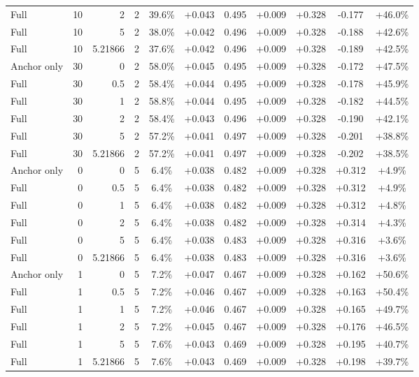 \begin{table}[htbp]
\begin{tabular}{lrrrccccccc}
Full & 10 & 2 & 2 & 39.6\% & +0.043 & 0.495 & +0.009 & +0.328 & -0.177 & +46.0\% \\
Full & 10 & 5 & 2 & 38.0\% & +0.042 & 0.496 & +0.009 & +0.328 & -0.188 & +42.6\% \\
Full & 10 & 5.21866 & 2 & 37.6\% & +0.042 & 0.496 & +0.009 & +0.328 & -0.189 & +42.5\% \\
Anchor only & 30 & 0 & 2 & 58.0\% & +0.045 & 0.495 & +0.009 & +0.328 & -0.172 & +47.5\% \\
Full & 30 & 0.5 & 2 & 58.4\% & +0.044 & 0.495 & +0.009 & +0.328 & -0.178 & +45.9\% \\
Full & 30 & 1 & 2 & 58.8\% & +0.044 & 0.495 & +0.009 & +0.328 & -0.182 & +44.5\% \\
Full & 30 & 2 & 2 & 58.4\% & +0.043 & 0.496 & +0.009 & +0.328 & -0.190 & +42.1\% \\
Full & 30 & 5 & 2 & 57.2\% & +0.041 & 0.497 & +0.009 & +0.328 & -0.201 & +38.8\% \\
Full & 30 & 5.21866 & 2 & 57.2\% & +0.041 & 0.497 & +0.009 & +0.328 & -0.202 & +38.5\% \\
Anchor only & 0 & 0 & 5 & 6.4\% & +0.038 & 0.482 & +0.009 & +0.328 & +0.312 & +4.9\% \\
Full & 0 & 0.5 & 5 & 6.4\% & +0.038 & 0.482 & +0.009 & +0.328 & +0.312 & +4.9\% \\
Full & 0 & 1 & 5 & 6.4\% & +0.038 & 0.482 & +0.009 & +0.328 & +0.312 & +4.8\% \\
Full & 0 & 2 & 5 & 6.4\% & +0.038 & 0.482 & +0.009 & +0.328 & +0.314 & +4.3\% \\
Full & 0 & 5 & 5 & 6.4\% & +0.038 & 0.483 & +0.009 & +0.328 & +0.316 & +3.6\% \\
Full & 0 & 5.21866 & 5 & 6.4\% & +0.038 & 0.483 & +0.009 & +0.328 & +0.316 & +3.6\% \\
Anchor only & 1 & 0 & 5 & 7.2\% & +0.047 & 0.467 & +0.009 & +0.328 & +0.162 & +50.6\% \\
Full & 1 & 0.5 & 5 & 7.2\% & +0.046 & 0.467 & +0.009 & +0.328 & +0.163 & +50.4\% \\
Full & 1 & 1 & 5 & 7.2\% & +0.046 & 0.467 & +0.009 & +0.328 & +0.165 & +49.7\% \\
Full & 1 & 2 & 5 & 7.2\% & +0.045 & 0.467 & +0.009 & +0.328 & +0.176 & +46.5\% \\
Full & 1 & 5 & 5 & 7.6\% & +0.043 & 0.469 & +0.009 & +0.328 & +0.195 & +40.7\% \\
Full & 1 & 5.21866 & 5 & 7.6\% & +0.043 & 0.469 & +0.009 & +0.328 & +0.198 & +39.7\% \\

\end{tabular}
\end{table}
